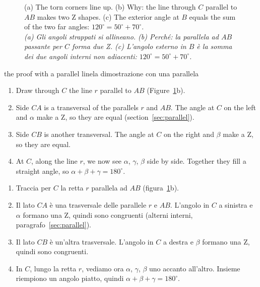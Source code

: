 \documentclass[10pt,a4paper,oneside]{book}
\newcommand{\bicap}[2]{\caption{#1\\{\color{itgreen}\itshape #2}}}
\begin{document}
\begin{figure}[htbp]
\bicap{(a) The torn corners line up. (b) Why: the line through $C$ parallel to $AB$ makes two Z shapes. (c) The exterior angle at $B$ equals the sum of the two far angles: $120^\circ = 50^\circ + 70^\circ$.}%
      {(a) Gli angoli strappati si allineano. (b) Perché: la parallela ad $AB$ passante per $C$ forma due Z. (c) L'angolo esterno in $B$ è la somma dei due angoli interni non adiacenti: $120^\circ = 50^\circ + 70^\circ$.}
\label{fig:sum}
\end{figure}

\begin{rebuild}{the proof with a parallel line}{la dimostrazione con una parallela}
\begin{enumerate}[label=\arabic*.]
\item Draw through $C$ the line $r$ parallel to $AB$ (Figure~\ref{fig:sum}b).
\item Side $CA$ is a transversal of the parallels $r$ and $AB$. The angle at $C$ on the left and $\alpha$ make a Z, so they are equal (section~\ref{sec:parallel}).
\item Side $CB$ is another transversal. The angle at $C$ on the right and $\beta$ make a Z, so they are equal.
\item At $C$, along the line $r$, we now see $\alpha$, $\gamma$, $\beta$ side by side. Together they fill a straight angle, so $\alpha + \beta + \gamma = 180^\circ$.
\end{enumerate}
\tcblower
\begin{enumerate}[label=\arabic*.]
\item Traccia per $C$ la retta $r$ parallela ad $AB$ (figura~\ref{fig:sum}b).
\item Il lato $CA$ è una trasversale delle parallele $r$ e $AB$. L'angolo in $C$ a sinistra e $\alpha$ formano una Z, quindi sono congruenti (alterni interni, paragrafo~\ref{sec:parallel}).
\item Il lato $CB$ è un'altra trasversale. L'angolo in $C$ a destra e $\beta$ formano una Z, quindi sono congruenti.
\item In $C$, lungo la retta $r$, vediamo ora $\alpha$, $\gamma$, $\beta$ uno accanto all'altro. Insieme riempiono un angolo piatto, quindi $\alpha + \beta + \gamma = 180^\circ$.
\end{enumerate}
\end{rebuild}
\end{document}
